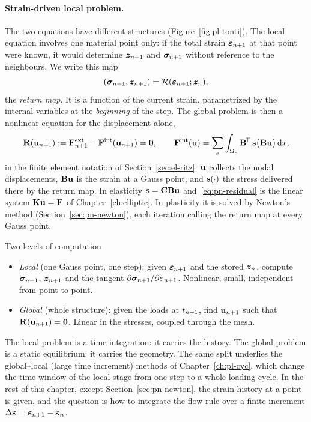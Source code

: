 \paragraph{Strain-driven local problem.}
%
The two equations have different structures (Figure~\ref{fig:pl-tonti}). The
local equation involves one material point only: if the total strain
$\bm{\varepsilon}_{n+1}$ at that point were known, it would determine $\bm{z}_{n+1}$ and
$\bm{\sigma}_{n+1}$ without reference to the neighbours. We write this map
\begin{equation}\label{eq:pn-returnmap}
  (\bm{\sigma}_{n+1},\bm{z}_{n+1})=\mathcal R(\bm{\varepsilon}_{n+1};\bm{z}_n),
\end{equation}
the \emph{return map}. It is a function of the current strain, parametrized by
the internal variables at the \emph{beginning} of the step. The global problem
is then a nonlinear equation for the displacement alone,
\begin{equation}\label{eq:pn-residual}
  \mathbf{R}(\mathbf{u}_{n+1}):=\mathbf{F}^{\mathrm{ext}}_{n+1}-\mathbf{F}^{\mathrm{int}}(\mathbf{u}_{n+1})=\mathbf{0},
  \qquad
  \mathbf{F}^{\mathrm{int}}(\mathbf{u})=\sum_e\int_{\Omega_e}\mathbf{B}^{\!\top}\,\mathbf{s}\bigl(\mathbf{B}\mathbf{u}\bigr)\,\mathrm{d} x ,
\end{equation}
in the finite element notation of Section~\ref{sec:el-ritz}: $\mathbf{u}$ collects
the nodal displacements, $\mathbf{B}\mathbf{u}$ is the strain at a Gauss point, and
$\mathbf{s}(\cdot)$ the stress delivered there by the return map. In elasticity
$\mathbf{s}=\mathbf{C}\mathbf{B}\mathbf{u}$ and~\eqref{eq:pn-residual} is the linear system
$\mathbf{K}\mathbf{u}=\mathbf{F}$ of Chapter~\ref{ch:elliptic}. In plasticity it is
solved by Newton's method (Section~\ref{sec:pn-newton}), each iteration calling
the return map at every Gauss point.

\begin{gbox}{Two levels of computation}
\begin{itemize}
  \item \emph{Local} (one Gauss point, one step): given $\bm{\varepsilon}_{n+1}$ and the
  stored $\bm{z}_n$, compute $\bm{\sigma}_{n+1}$, $\bm{z}_{n+1}$ and the tangent
  $\partial\bm{\sigma}_{n+1}/\partial\bm{\varepsilon}_{n+1}$. Nonlinear, small, independent from
  point to point.
  \item \emph{Global} (whole structure): given the loads at $t_{n+1}$, find
  $\mathbf{u}_{n+1}$ such that $\mathbf{R}(\mathbf{u}_{n+1})=\mathbf{0}$. Linear in the stresses,
  coupled through the mesh.
\end{itemize}
\end{gbox}
The local problem is a time integration: it carries the history. The global
problem is a static equilibrium: it carries the geometry. The same split
underlies the global--local (large time increment) methods of
Chapter~\ref{ch:pl-cyc}, which change the time window of the local stage from
one step to a whole loading cycle. In the rest of this
chapter, except Section~\ref{sec:pn-newton}, the strain history at a point is
given, and the question is how to integrate the flow rule over a finite
increment $\Delta\bm{\varepsilon}=\bm{\varepsilon}_{n+1}-\bm{\varepsilon}_n$.

